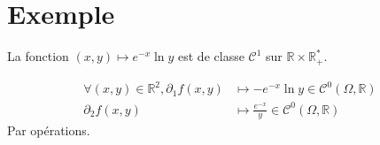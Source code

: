 \documentclass[../main.tex]{subfiles}
\begin{document}
\section{Exemple}
\begin{tcolorbox}[title=Exemple 36.35, title filled=false, colframe=darkgreen, colback=darkgreen!10!white]
    La fonction $(x, y)\mapsto e^{-x}\ln y$ est de classe $\mathcal{C}^1$ sur $\mathbb{R} \times \mathbb{R}_+^*$. 
\end{tcolorbox}

\begin{align*}
    \forall (x, y)\in \mathbb{R}^2, \partial_1f(x, y) &\mapsto -e^{-x}\ln y \in \mathcal{C}^0(\Omega, \mathbb{R}) \\
    \partial_2f(x, y) &\mapsto \frac{e^{-x}}{y} \in \mathcal{C}^0(\Omega, \mathbb{R})
\end{align*}
Par opérations. 
\end{document}
